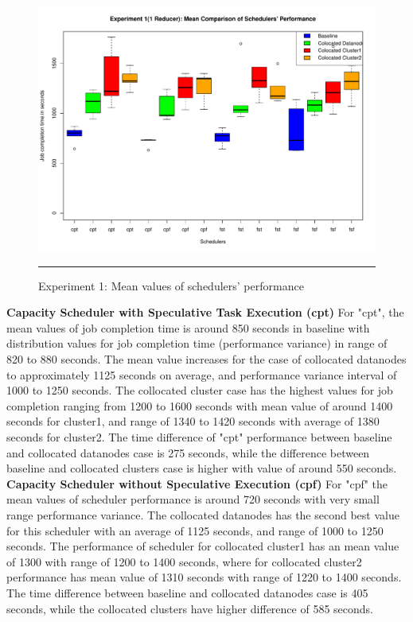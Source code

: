 \begin{figure}[htbp]
  \centering
    \includegraphics[width=\textwidth,height=\textheight,keepaspectratio]{./Figures/exp_1_mean.pdf}
    \rule{35em}{0.5pt}
  \caption{Experiment 1: Mean values of schedulers' performance }
  \label{fig:exp_1_mean}
\end{figure} 


\textbf{Capacity Scheduler with Speculative Task Execution (cpt)} For "cpt", the mean values of job completion time is around 850 seconds in baseline with distribution values for job completion time (performance variance) in range of 820 to 880 seconds. The mean value increases for the case of collocated datanodes to approximately 1125 seconds on average, and performance variance interval of 1000 to 1250 seconds. The collocated cluster case has the highest values for job completion ranging from 1200 to 1600 seconds with mean value of around 1400 seconds for cluster1, and range of 1340 to 1420 seconds with average of 1380 seconds for cluster2. The time difference of "cpt" performance between baseline and collocated datanodes case is 275 seconds, while the difference between baseline and collocated clusters case is higher with value of around 550 seconds.\\  

\textbf{Capacity Scheduler without Speculative Execution (cpf)} For "cpf" the mean values of scheduler performance is around 720 seconds with very small range performance variance. The collocated datanodes has the second best value for this scheduler with an average of 1125 seconds, and range of 1000 to 1250 seconds. The performance of scheduler for collocated cluster1 has an mean value of 1300 with range of 1200 to 1400 seconds, where for collocated cluster2 performance has mean value of 1310 seconds with range of 1220 to 1400 seconds. The time difference between baseline and collocated datanodes case is 405 seconds, while the collocated clusters have higher difference of 585 seconds.\\   


